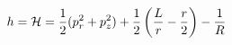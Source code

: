 \documentclass[preview]{standalone}
\begin{document}
\begin{align*}
h = \mathcal{H}=\frac{1}{2}(p_r^2+p_z^2)+ \frac{1}{2}\left({ L \over r}-\frac{r}{2}\right)-\frac{1}{R}
\end{align*}
\end{document}
